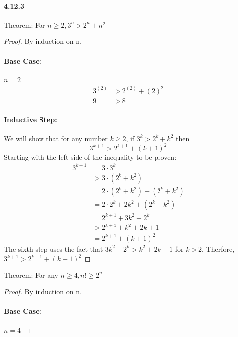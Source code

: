 \documentclass[11pt, letterpaper, twocolumn, fleqn]{article}
\begin{document}
    \paragraph{4.12.3}
        \begin{enumerate}
            \item Theorem: For $n\geq2, 3^n>2^n+n^2$
              \begin{proof} By induction on n.
                \item \paragraph{Base Case:} $n=2$
                  \begin{align*}
                    3^{(2)} &> 2^{(2)}+(2)^2 \\
                    9 &> 8
                  \end{align*}
                  \item \paragraph{Inductive Step:} We will show that for any number $k\geq2$, if $3^k > 2^k + k^2$ then 
                    $$3^{k+1} > 2^{k+1} + (k+1)^2$$
                  Starting with the left side of the inequality to be proven:
                  \begin{align*}
                    3^{k+1} &= 3 \cdot 3^k \\
                    &> 3 \cdot (2^k + k^2) \tag{inductive hypothesis} \\
                    &= 2 \cdot (2^k + k^2) + (2^k + k^2) \\
                    &= 2 \cdot 2^k + 2k^2 + (2^k + k^2) \\
                    &= 2^{k+1} + 3k^2 + 2^k \\
                    &> 2^{k+1} + k^2 + 2k + 1 \\
                    &= 2^{k+1} + (k+1)^2
                  \end{align*}
                  The sixth step uses the fact that $3k^2 + 2^k > k^2 + 2k+1$ for $k > 2$.
                  Therfore, $3^{k+1} > 2^{k+1} + (k+1)^2$
              \end{proof}
            \item Theorem: For any $n \geq 4, n! \geq 2^n$
            \begin{proof} By induction on n.
              \item \paragraph{Base Case:} $n=4$ 

\end{proof}
\end{enumerate}
\end{document}
